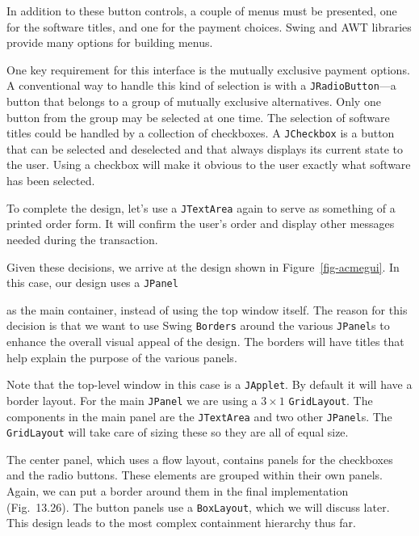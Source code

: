 In addition to these button controls, a couple of menus must be
presented, one for the software titles, and one for the payment
choices.  Swing and AWT libraries provide many options for building
menus.

One key requirement for this interface is the mutually exclusive
payment options.  A conventional way to handle this kind of selection
is with a {\tt JRadioButton}---a button that belongs to a group of
mutually exclusive alternatives.  Only one button from the group may be
selected at one time.   The selection of software titles could be
handled by a collection of checkboxes.  A {\tt JCheckbox} is a button
that can be selected and deselected and that always displays its
current state to the user.  Using a checkbox will make it obvious to
the user exactly what software has been selected.

To complete the design, let's use a {\tt JTextArea} again to serve
as something of a printed order form.  It will confirm the user's
order and display other messages needed during the transaction.


Given these decisions, we arrive at the design shown in
Figure~\ref{fig-acmegui}. In this case, our design uses a {\tt JPanel}
\begin{figure}[b]
\end{figure}
as the main container, instead of using the top window itself.  The
reason for this decision is that we want to use Swing {\tt Borders}
around the various {\tt JPanel}s to enhance the overall visual appeal
of the design.  The borders will have titles that help explain the
purpose of the various panels.

Note that the top-level window in this case is a {\tt JApplet}. By default
it will have a border layout.  For the main {\tt JPanel} we are using a
$3 \times 1$ {\tt GridLayout}. The components in the main panel are
the {\tt JTextArea} and two other {\tt JPanel}s.  The {\tt GridLayout}
will take care of sizing these so they are all of equal size.


The center panel, which uses a flow layout, contains panels for the
checkboxes and
the radio buttons.  These elements are grouped within
their own panels.  Again, we can put a border around them in the final
implementation (Fig.~13.26).  The button panels use a
{\tt BoxLayout}, which we will discuss later.
This design leads to the most complex containment hierarchy thus far.

